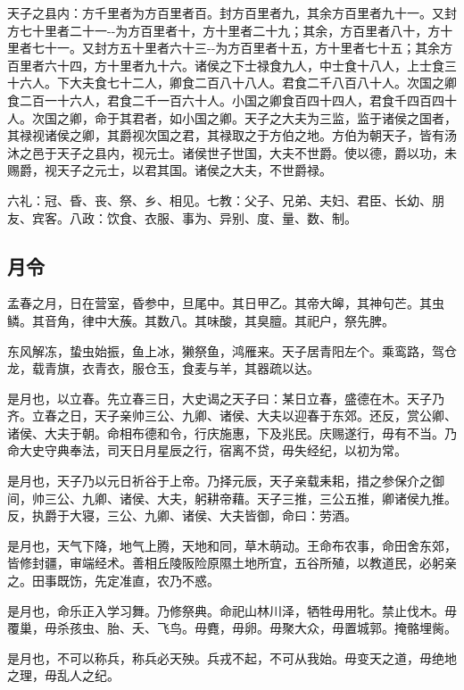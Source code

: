 \documentclass[]{article}
\begin{document}
天子之县内：方千里者为方百里者百。封方百里者九，其余方百里者九十一。又封方七十里者二十一-\/-为方百里者十，方十里者二十九；其余，方百里者八十，方十里者七十一。又封方五十里者六十三-\/-为方百里者十五，方十里者七十五；其余方百里者六十四，方十里者九十六。诸侯之下士禄食九人，中士食十八人，上士食三十六人。下大夫食七十二人，卿食二百八十八人。君食二千八百八十人。次国之卿食二百一十六人，君食二千一百六十人。小国之卿食百四十四人，君食千四百四十人。次国之卿，命于其君者，如小国之卿。天子之大夫为三监，监于诸侯之国者，其禄视诸侯之卿，其爵视次国之君，其禄取之于方伯之地。方伯为朝天子，皆有汤沐之邑于天子之县内，视元士。诸侯世子世国，大夫不世爵。使以德，爵以功，未赐爵，视天子之元士，以君其国。诸侯之大夫，不世爵禄。

六礼：冠、昏、丧、祭、乡、相见。七教：父子、兄弟、夫妇、君臣、长幼、朋友、宾客。八政：饮食、衣服、事为、异别、度、量、数、制。

\hypertarget{header-n300}{%
\subsection{月令}\label{header-n300}}

孟春之月，日在营室，昏参中，旦尾中。其日甲乙。其帝大皞，其神句芒。其虫鳞。其音角，律中大蔟。其数八。其味酸，其臭膻。其祀户，祭先脾。

东风解冻，蛰虫始振，鱼上冰，獭祭鱼，鸿雁来。天子居青阳左个。乘鸾路，驾仓龙，载青旗，衣青衣，服仓玉，食麦与羊，其器疏以达。

是月也，以立春。先立春三日，大史谒之天子曰：某日立春，盛德在木。天子乃齐。立春之日，天子亲帅三公、九卿、诸侯、大夫以迎春于东郊。还反，赏公卿、诸侯、大夫于朝。命相布德和令，行庆施惠，下及兆民。庆赐遂行，毋有不当。乃命大史守典奉法，司天日月星辰之行，宿离不贷，毋失经纪，以初为常。

是月也，天子乃以元日祈谷于上帝。乃择元辰，天子亲载耒耜，措之参保介之御间，帅三公、九卿、诸侯、大夫，躬耕帝藉。天子三推，三公五推，卿诸侯九推。反，执爵于大寝，三公、九卿、诸侯、大夫皆御，命曰：劳酒。

是月也，天气下降，地气上腾，天地和同，草木萌动。王命布农事，命田舍东郊，皆修封疆，审端经术。善相丘陵阪险原隰土地所宜，五谷所殖，以教道民，必躬亲之。田事既饬，先定准直，农乃不惑。

是月也，命乐正入学习舞。乃修祭典。命祀山林川泽，牺牲毋用牝。禁止伐木。毋覆巢，毋杀孩虫、胎、夭、飞鸟。毋麑，毋卵。毋聚大众，毋置城郭。掩骼埋胔。

是月也，不可以称兵，称兵必天殃。兵戎不起，不可从我始。毋变天之道，毋绝地之理，毋乱人之纪。
\end{document}
